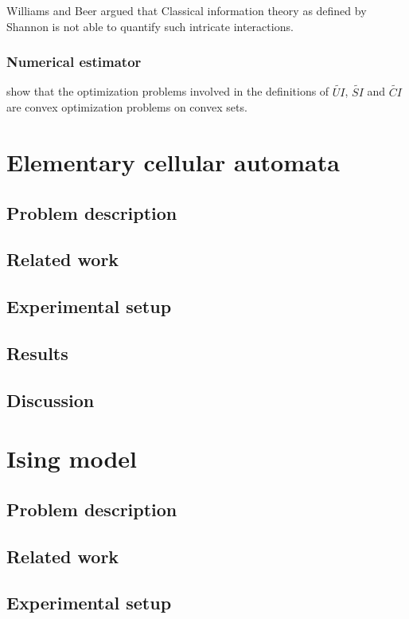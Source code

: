 \documentclass[12pt]{article}
\begin{document}
Williams and Beer \cite{williams-beer} argued that Classical information theory as defined by Shannon is not able to quantify such intricate interactions. 

\subsubsection{Numerical estimator}

\cite{bertschinger} show that the optimization problems involved in the definitions of $\widetilde{UI}$, $\widetilde{SI}$ and $\widetilde{CI}$ are convex optimization problems on convex sets.

\newpage
\section{Elementary cellular automata}

\subsection{Problem description}
\subsection{Related work}
\subsection{Experimental setup}
\subsection{Results}
\subsection{Discussion}

\newpage
\section{Ising model}

\subsection{Problem description}
\subsection{Related work}
\subsection{Experimental setup}
\end{document}
